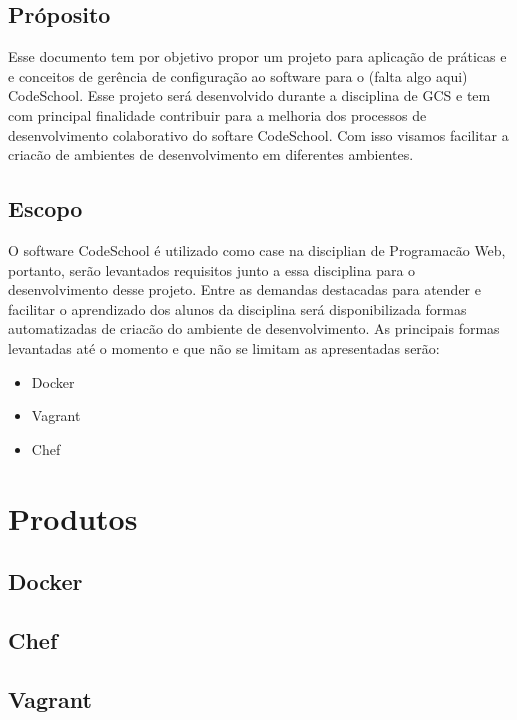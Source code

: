 \documentclass{article}
\begin{document}
\subsection{Próposito}

Esse documento tem por objetivo propor um projeto para aplicação de práticas e e conceitos de gerência de configuração ao software para o (falta algo aqui) CodeSchool. Esse projeto será desenvolvido durante a disciplina de GCS e tem com principal finalidade contribuir para a melhoria dos processos de desenvolvimento colaborativo do softare CodeSchool. Com isso visamos facilitar a criacão de ambientes de desenvolvimento em diferentes ambientes. 

\subsection{Escopo}

O software CodeSchool é utilizado como case na disciplian de Programacão Web, portanto, serão levantados requisitos junto a essa disciplina para o desenvolvimento desse projeto. Entre as demandas destacadas para atender e facilitar o aprendizado dos alunos da disciplina será disponibilizada formas automatizadas de criacão do ambiente de desenvolvimento. As principais formas levantadas até o momento e que não se limitam as apresentadas serão:

\begin{itemize}
    \item Docker
    \item Vagrant 
    \item Chef
\end{itemize}
  
\newpage

\section{Produtos}
\subsection{Docker}
\subsection{Chef}
\subsection{Vagrant}
\end{document}
